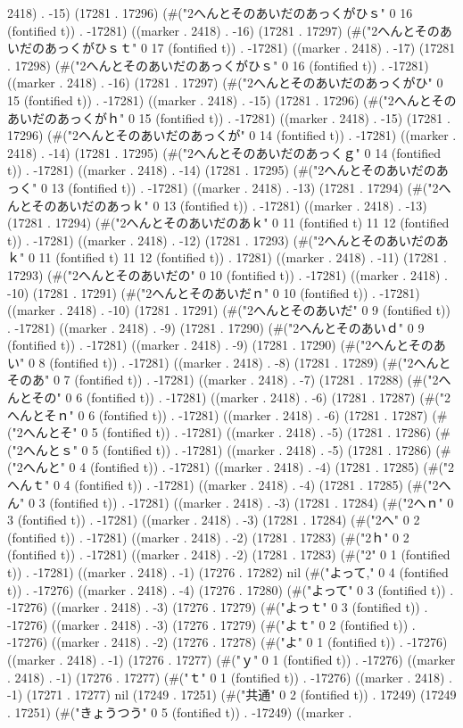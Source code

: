2418) . -15) (17281 . 17296) (#("2へんとそのあいだのあっくがひｓ" 0 16 (fontified t)) . -17281) ((marker . 2418) . -16) (17281 . 17297) (#("2へんとそのあいだのあっくがひｓｔ" 0 17 (fontified t)) . -17281) ((marker . 2418) . -17) (17281 . 17298) (#("2へんとそのあいだのあっくがひｓ" 0 16 (fontified t)) . -17281) ((marker . 2418) . -16) (17281 . 17297) (#("2へんとそのあいだのあっくがひ" 0 15 (fontified t)) . -17281) ((marker . 2418) . -15) (17281 . 17296) (#("2へんとそのあいだのあっくがｈ" 0 15 (fontified t)) . -17281) ((marker . 2418) . -15) (17281 . 17296) (#("2へんとそのあいだのあっくが" 0 14 (fontified t)) . -17281) ((marker . 2418) . -14) (17281 . 17295) (#("2へんとそのあいだのあっくｇ" 0 14 (fontified t)) . -17281) ((marker . 2418) . -14) (17281 . 17295) (#("2へんとそのあいだのあっく" 0 13 (fontified t)) . -17281) ((marker . 2418) . -13) (17281 . 17294) (#("2へんとそのあいだのあっｋ" 0 13 (fontified t)) . -17281) ((marker . 2418) . -13) (17281 . 17294) (#("2へんとそのあいだのあｋ" 0 11 (fontified t) 11 12 (fontified t)) . -17281) ((marker . 2418) . -12) (17281 . 17293) (#("2へんとそのあいだのあｋ" 0 11 (fontified t) 11 12 (fontified t)) . 17281) ((marker . 2418) . -11) (17281 . 17293) (#("2へんとそのあいだの" 0 10 (fontified t)) . -17281) ((marker . 2418) . -10) (17281 . 17291) (#("2へんとそのあいだｎ" 0 10 (fontified t)) . -17281) ((marker . 2418) . -10) (17281 . 17291) (#("2へんとそのあいだ" 0 9 (fontified t)) . -17281) ((marker . 2418) . -9) (17281 . 17290) (#("2へんとそのあいｄ" 0 9 (fontified t)) . -17281) ((marker . 2418) . -9) (17281 . 17290) (#("2へんとそのあい" 0 8 (fontified t)) . -17281) ((marker . 2418) . -8) (17281 . 17289) (#("2へんとそのあ" 0 7 (fontified t)) . -17281) ((marker . 2418) . -7) (17281 . 17288) (#("2へんとその" 0 6 (fontified t)) . -17281) ((marker . 2418) . -6) (17281 . 17287) (#("2へんとそｎ" 0 6 (fontified t)) . -17281) ((marker . 2418) . -6) (17281 . 17287) (#("2へんとそ" 0 5 (fontified t)) . -17281) ((marker . 2418) . -5) (17281 . 17286) (#("2へんとｓ" 0 5 (fontified t)) . -17281) ((marker . 2418) . -5) (17281 . 17286) (#("2へんと" 0 4 (fontified t)) . -17281) ((marker . 2418) . -4) (17281 . 17285) (#("2へんｔ" 0 4 (fontified t)) . -17281) ((marker . 2418) . -4) (17281 . 17285) (#("2へん" 0 3 (fontified t)) . -17281) ((marker . 2418) . -3) (17281 . 17284) (#("2へｎ" 0 3 (fontified t)) . -17281) ((marker . 2418) . -3) (17281 . 17284) (#("2へ" 0 2 (fontified t)) . -17281) ((marker . 2418) . -2) (17281 . 17283) (#("2ｈ" 0 2 (fontified t)) . -17281) ((marker . 2418) . -2) (17281 . 17283) (#("2" 0 1 (fontified t)) . -17281) ((marker . 2418) . -1) (17276 . 17282) nil (#("よって," 0 4 (fontified t)) . -17276) ((marker . 2418) . -4) (17276 . 17280) (#("よって" 0 3 (fontified t)) . -17276) ((marker . 2418) . -3) (17276 . 17279) (#("よっｔ" 0 3 (fontified t)) . -17276) ((marker . 2418) . -3) (17276 . 17279) (#("よｔ" 0 2 (fontified t)) . -17276) ((marker . 2418) . -2) (17276 . 17278) (#("よ" 0 1 (fontified t)) . -17276) ((marker . 2418) . -1) (17276 . 17277) (#("ｙ" 0 1 (fontified t)) . -17276) ((marker . 2418) . -1) (17276 . 17277) (#("ｔ" 0 1 (fontified t)) . -17276) ((marker . 2418) . -1) (17271 . 17277) nil (17249 . 17251) (#("共通" 0 2 (fontified t)) . 17249) (17249 . 17251) (#("きょうつう" 0 5 (fontified t)) . -17249) ((marker . 